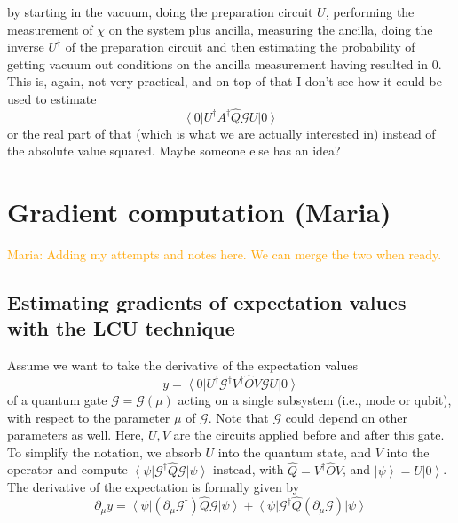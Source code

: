 \documentclass[aps,pra,10pt,twocolumn,groupedaddress,nofootinbib]{revtex4-1}
\theoremstyle{plain}
\newcommand{\ket}[1]{\ensuremath{\left| #1 \right \rangle}}
\newcommand{\bra}[1]{\ensuremath{\left \langle #1 \right |}}
\newcommand{\G}{\mathcal{G}}
\newcommand{\maria}[1]{\textcolor{orange}{Maria: #1}}
\begin{document}
\begin{description}
  by starting in the vacuum, doing the preparation circuit $U$, performing the measurement of $\chi$ on the system plus ancilla, measuring the ancilla, doing the inverse $U^\dagger$ of the preparation circuit and then estimating the probability of getting vacuum out conditions on the ancilla measurement having resulted in $0$.
  This is, again, not very practical, and on top of that I don't see how it could be used to estimate 
  \begin{equation}
    \bra{0} U^\dagger A^{\dagger}  \hat{Q} \G U \ket{0}
  \end{equation}
  or the real part of that (which is what we are actually interested in) instead of the absolute value squared.
  Maybe someone else has an idea?
\end{description}

\section{Gradient computation (Maria)}\label{sec:gradient_computation_Maria}
\maria{Adding my attempts and notes here. We can merge the two when ready.}

\subsection{Estimating gradients of expectation values with the LCU technique}

Assume we want to take the derivative of the expectation values
\[ y = \bra{0}U^{\dagger} \G^{\dagger}  V^{\dagger} \hat{O} V \G U \ket{0}\]
of a quantum gate $\G = \G(\mu)$ acting on a single subsystem (i.e., mode or qubit), with respect to the parameter $\mu$ of $\G$. Note that $\G$ could depend on other parameters as well. Here, $U,V$ are the circuits applied before and after this gate. To simplify the notation, we absorb $U$ into the quantum state, and $V$ into the operator and compute $ \bra{\psi} \G^{\dagger}  \hat{Q} \G \ket{\psi}$ instead, with $\hat{Q} = V^{\dagger} \hat{O} V$, and $\ket{\psi}= U \ket{0}$.\\

The derivative of the expectation is formally given by
\begin{equation}
	\partial_{\mu} y = \bra{\psi} ( \partial_{\mu}\G^{\dagger})  \hat{Q} \G \ket{\psi} + \bra{\psi} \G^{\dagger}  \hat{Q}  (\partial_{\mu}\G) \ket{\psi}
	\label{Eq:der_of_exp}
\end{equation}
\end{document}
